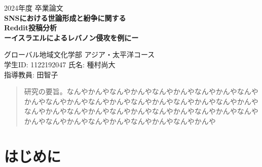 \documentclass[11pt, a4j]{jreport}
\begin{document}
    \thispagestyle{empty}
    \begin{center}
        \vspace{20mm}
        {\Large\noindent 2024年度 卒業論文}\\
        \vspace{40mm}
        {\huge\noindent\textbf{SNSにおける世論形成と紛争に関する\\
        Reddit投稿分析}}\\
        \medskip
        {\huge\noindent\textbf{ーイスラエルによるレバノン侵攻を例にー}}\\
        \vspace{\baselineskip}
        \vspace{40mm}
    
        {\Large\noindent グローバル地域文化学部 アジア・太平洋コース \\ 
        \vspace{\baselineskip} 学生ID: 1122192047 氏名: 種村尚大\\
        \vspace{\baselineskip} 指導教員: 田智子 }
        \vspace{40mm}
    \end{center}

    \thispagestyle{empty}
    \clearpage

    \renewcommand{\abstractname}{要旨}

    \begin{abstract}
        研究の要旨。なんやかんやなんやかんやなんやかんやなんやかんやなんやかんやなんやかんやなんやかんやなんやかんやなんやかんやなんやかんやなんやかんやなんやかんやなんやかんやなんやかんやなんやかんやなんやかんやなんやかんやなんやかんやなんやかんやなんやかんや
    \end{abstract}


    {\makeatletter
    \let\ps@jpl@in\ps@empty
    \makeatother
    \pagestyle{empty}
    \tableofcontents
    \clearpage}
    \pagestyle{plain}
    \lhead{\rightmark}
    \renewcommand{\chaptermark}[1]{\markboth{第\ \normalfont\thechapter\ 章~~#1}{}}

    \chapter{はじめに} %
    \setcounter{page}{1} %
\end{document}

